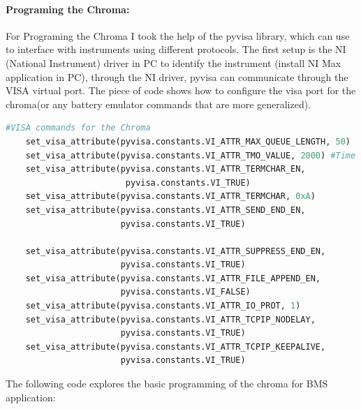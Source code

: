 \paragraph{Programing the Chroma:}

For Programing the Chroma I took the help of the pyvisa library, which can use to interface with instruments using different protocols. The first setup is the NI (National Instrument) driver in PC to identify the instrument (install NI Max application in PC), through the NI driver, pyvisa can communicate through the VISA virtual port. The piece of code shows how to configure the visa port for the chroma(or any battery emulator commands that are more generalized).

% 
\begin{lstlisting}[language=Python, caption=VISA parameters set for Chroma]
    #VISA commands for the Chroma
    set_visa_attribute(pyvisa.constants.VI_ATTR_MAX_QUEUE_LENGTH, 50)
    set_visa_attribute(pyvisa.constants.VI_ATTR_TMO_VALUE, 2000) #Time Out Value 
    set_visa_attribute(pyvisa.constants.VI_ATTR_TERMCHAR_EN, 
                        pyvisa.constants.VI_TRUE)
    set_visa_attribute(pyvisa.constants.VI_ATTR_TERMCHAR, 0xA) 
    set_visa_attribute(pyvisa.constants.VI_ATTR_SEND_END_EN, 
                       pyvisa.constants.VI_TRUE) 
    
    set_visa_attribute(pyvisa.constants.VI_ATTR_SUPPRESS_END_EN, 
                       pyvisa.constants.VI_TRUE)
    set_visa_attribute(pyvisa.constants.VI_ATTR_FILE_APPEND_EN, 
                       pyvisa.constants.VI_FALSE) 
    set_visa_attribute(pyvisa.constants.VI_ATTR_IO_PROT, 1) 
    set_visa_attribute(pyvisa.constants.VI_ATTR_TCPIP_NODELAY, 
                       pyvisa.constants.VI_TRUE) 
    set_visa_attribute(pyvisa.constants.VI_ATTR_TCPIP_KEEPALIVE, 
                       pyvisa.constants.VI_TRUE)
\end{lstlisting}

The following code explores the basic programming of the chroma for BMS application:

